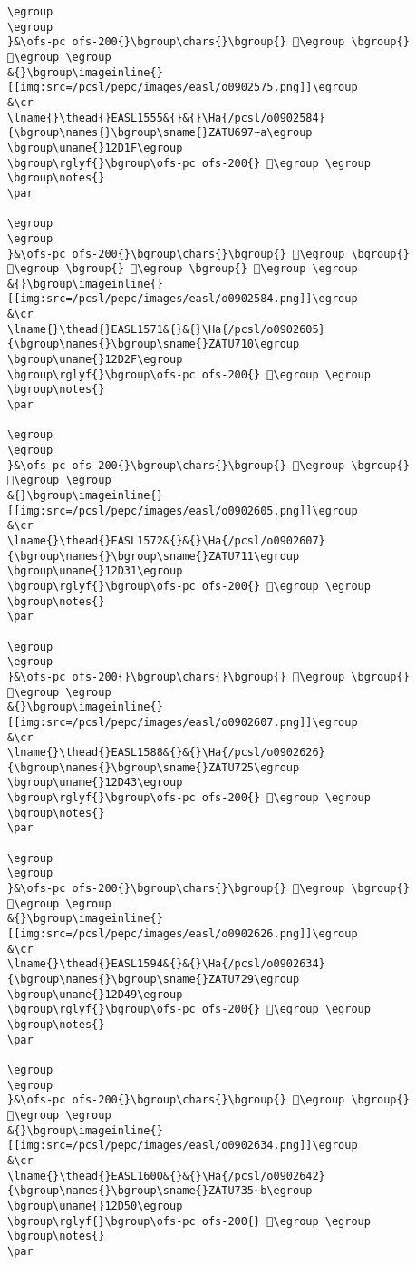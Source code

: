 \begin{verbatim}
\egroup
\egroup
}&\ofs-pc ofs-200{}\bgroup\chars{}\bgroup{} 𒴖\egroup \bgroup{} 𒴗\egroup \egroup
&{}\bgroup\imageinline{}[[img:src=/pcsl/pepc/images/easl/o0902575.png]]\egroup
&\cr
\lname{}\thead{}EASL1555&{}&{}\Ha{/pcsl/o0902584}{\bgroup\names{}\bgroup\sname{}ZATU697∼a\egroup
\bgroup\uname{}12D1F\egroup
\bgroup\rglyf{}\bgroup\ofs-pc ofs-200{} 𒴟\egroup \egroup
\bgroup\notes{}
\par 

\egroup
\egroup
}&\ofs-pc ofs-200{}\bgroup\chars{}\bgroup{} 𒴜\egroup \bgroup{} 𒴝\egroup \bgroup{} 𒴞\egroup \bgroup{} 𒴟\egroup \egroup
&{}\bgroup\imageinline{}[[img:src=/pcsl/pepc/images/easl/o0902584.png]]\egroup
&\cr
\lname{}\thead{}EASL1571&{}&{}\Ha{/pcsl/o0902605}{\bgroup\names{}\bgroup\sname{}ZATU710\egroup
\bgroup\uname{}12D2F\egroup
\bgroup\rglyf{}\bgroup\ofs-pc ofs-200{} 𒴯\egroup \egroup
\bgroup\notes{}
\par 

\egroup
\egroup
}&\ofs-pc ofs-200{}\bgroup\chars{}\bgroup{} 𒴯\egroup \bgroup{} 𒴰\egroup \egroup
&{}\bgroup\imageinline{}[[img:src=/pcsl/pepc/images/easl/o0902605.png]]\egroup
&\cr
\lname{}\thead{}EASL1572&{}&{}\Ha{/pcsl/o0902607}{\bgroup\names{}\bgroup\sname{}ZATU711\egroup
\bgroup\uname{}12D31\egroup
\bgroup\rglyf{}\bgroup\ofs-pc ofs-200{} 𒴱\egroup \egroup
\bgroup\notes{}
\par 

\egroup
\egroup
}&\ofs-pc ofs-200{}\bgroup\chars{}\bgroup{} 𒴲\egroup \bgroup{} 𒴱\egroup \egroup
&{}\bgroup\imageinline{}[[img:src=/pcsl/pepc/images/easl/o0902607.png]]\egroup
&\cr
\lname{}\thead{}EASL1588&{}&{}\Ha{/pcsl/o0902626}{\bgroup\names{}\bgroup\sname{}ZATU725\egroup
\bgroup\uname{}12D43\egroup
\bgroup\rglyf{}\bgroup\ofs-pc ofs-200{} 𒵃\egroup \egroup
\bgroup\notes{}
\par 

\egroup
\egroup
}&\ofs-pc ofs-200{}\bgroup\chars{}\bgroup{} 𒵂\egroup \bgroup{} 𒵃\egroup \egroup
&{}\bgroup\imageinline{}[[img:src=/pcsl/pepc/images/easl/o0902626.png]]\egroup
&\cr
\lname{}\thead{}EASL1594&{}&{}\Ha{/pcsl/o0902634}{\bgroup\names{}\bgroup\sname{}ZATU729\egroup
\bgroup\uname{}12D49\egroup
\bgroup\rglyf{}\bgroup\ofs-pc ofs-200{} 𒵉\egroup \egroup
\bgroup\notes{}
\par 

\egroup
\egroup
}&\ofs-pc ofs-200{}\bgroup\chars{}\bgroup{} 𒵉\egroup \bgroup{} 𒵊\egroup \egroup
&{}\bgroup\imageinline{}[[img:src=/pcsl/pepc/images/easl/o0902634.png]]\egroup
&\cr
\lname{}\thead{}EASL1600&{}&{}\Ha{/pcsl/o0902642}{\bgroup\names{}\bgroup\sname{}ZATU735∼b\egroup
\bgroup\uname{}12D50\egroup
\bgroup\rglyf{}\bgroup\ofs-pc ofs-200{} 𒵐\egroup \egroup
\bgroup\notes{}
\par 


\end{verbatim}
